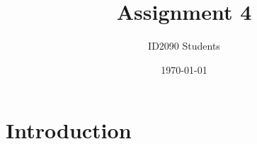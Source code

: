 \documentclass[a4paper, 12pt]{article}
\begin{document}
\title{Assignment 4}
\author{ID2090 Students}
\date{\today}
\maketitle

\tableofcontents

\section{Introduction}

\end{document}
